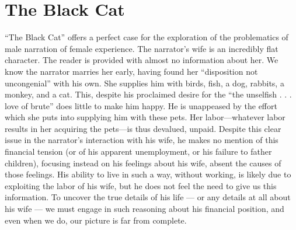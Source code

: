 \documentclass[man,12pt,natbib]{apa6}
\begin{document}
%

\section{The Black Cat}
\nocite{Poe12b}

``The Black Cat'' offers a perfect case for the exploration of the problematics
of male narration of female experience. The narrator's wife is an incredibly
flat character. The reader is provided with almost no information about her.
We know the narrator marries her early, having found her ``disposition not
uncongenial'' with his own. She supplies him with birds, fish, a dog, rabbits,
a monkey, and a cat. This, despite his proclaimed desire for the ``the
unselfish . . . love of brute'' does little to make him happy. He is unappeased
by the effort which she puts into supplying him with these pets. Her
labor---whatever labor results in her acquiring the pets---is thus devalued,
unpaid. Despite this clear issue in the narrator's interaction with his wife,
he makes no mention of this financial tension (or of his apparent unemployment,
or his failure to father children), focusing instead on his feelings about his
wife, absent the causes of those feelings. His ability to live in such a way,
without working, is likely due to exploiting the labor of his wife, but he does
not feel the need to give us this information. To uncover the true details of
his life --- or any details at all about his wife --- we must engage in such
reasoning about his financial position, and even when we do, our picture is far
from complete.
\end{document}
